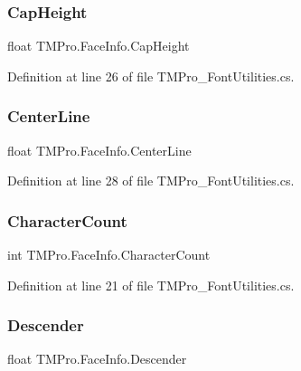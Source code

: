 \subsubsection{\texorpdfstring{CapHeight}{CapHeight}}
{\footnotesize\ttfamily float T\+M\+Pro.\+Face\+Info.\+Cap\+Height}



Definition at line 26 of file T\+M\+Pro\+\_\+\+Font\+Utilities.\+cs.

\mbox{\label{class_t_m_pro_1_1_face_info_a88a11296f260a733bd93fe6337c6bc74}} 
\subsubsection{\texorpdfstring{CenterLine}{CenterLine}}
{\footnotesize\ttfamily float T\+M\+Pro.\+Face\+Info.\+Center\+Line}



Definition at line 28 of file T\+M\+Pro\+\_\+\+Font\+Utilities.\+cs.

\mbox{\label{class_t_m_pro_1_1_face_info_a625e4c7118d22fc0e9e8e930c978bd47}} 
\subsubsection{\texorpdfstring{CharacterCount}{CharacterCount}}
{\footnotesize\ttfamily int T\+M\+Pro.\+Face\+Info.\+Character\+Count}



Definition at line 21 of file T\+M\+Pro\+\_\+\+Font\+Utilities.\+cs.

\mbox{\label{class_t_m_pro_1_1_face_info_a96a9406c35a8c64e732fc5e427a58326}} 
\subsubsection{\texorpdfstring{Descender}{Descender}}
{\footnotesize\ttfamily float T\+M\+Pro.\+Face\+Info.\+Descender}



